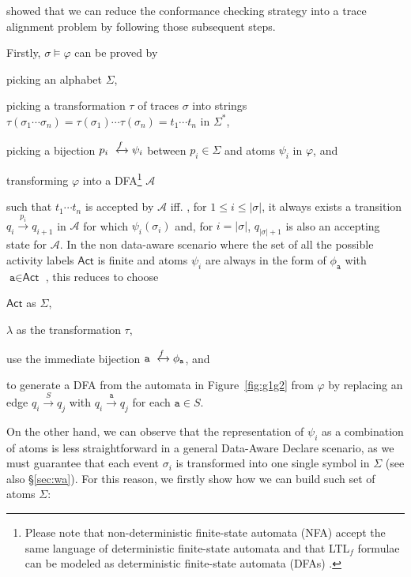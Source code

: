 \cite{XuLZ17a} showed that we can reduce the conformance checking strategy into a trace alignment problem by following those subsequent steps.

Firstly,  $\sigma\vDash\varphi$ can be proved by
 \begin{enumerate*}[label=\emph{\alph*})]
\item  picking an alphabet $\Sigma$,
\item  picking a transformation $\tau$ of traces $\sigma$ into strings $\tau(\sigma_1\cdots \sigma_n)=\tau(\sigma_1)\cdots \tau(\sigma_n)=t_1\cdots t_n$ in $\Sigma^*$,
\item  picking a bijection $p_i\xleftrightarrow{f}\psi_i$ between $p_i\in\Sigma$ and atoms $\psi_i$ in $\varphi$, and
\item  transforming $\varphi$ into a  DFA\footnote{Please note that non-deterministic finite-state automata (NFA) accept the same language of deterministic finite-state automata \cite{0016921} and that LTL$_f$ formulae can be modeled as deterministic finite-state automata (DFAs) \cite{Westergaard11,Lydia}.}  $\mathcal{A}$
\end{enumerate*} %
such that $t_1\cdots t_n$ is accepted by $\mathcal{A}$ iff. %
, for $1\leq i\leq |\sigma|$, it always exists a transition $q_i\xrightarrow{p_i}q_{i+1}$ in $\mathcal{A}$ for which $\psi_i(\sigma_i)$ and, for $i=|\sigma|$, $q_{|\sigma|+1}$ is also an accepting state for $\mathcal{A}$. In the non data-aware  scenario where the set of all the possible activity labels $\textsf{Act}$ is finite and atoms $\psi_i$ are always in the form of $\phi_{\texttt{a}}$ with $\texttt{a}\in\textsf{Act}$ \cite{XuLZ17a,Westergaard11}, this reduces to choose
 \begin{enumerate*}[label=\emph{\alph*})]
	\item  $\textsf{Act}$ as $\Sigma$,
	\item  $\lambda$ as the transformation $\tau$,
	\item  use the immediate bijection $\texttt{a}\xleftrightarrow{f}\phi_{\texttt{a}}$, and
	\item  to generate a DFA from the automata in Figure~\ref{fig:g1g2} from $\varphi$ by replacing an edge $q_i\xrightarrow{S}q_j$ with $q_i\xrightarrow{\texttt{a}}q_j$ for each $\texttt{a}\in S$. 
\end{enumerate*} On the other hand, we can observe that the representation of $\psi_i$ as a combination of atoms is less straightforward in a general Data-Aware Declare scenario, as we must guarantee that each event $\sigma_i$ is transformed into one single symbol in $\Sigma$ (see also \S\ref{sec:wa}). For this reason, we firstly show how we can build such set of atoms $\Sigma$:

